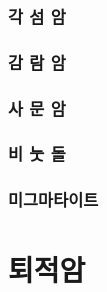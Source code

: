 \documentclass[12pt, a4paper, twoside]{book}
\begin{document}
	\clearpage
	\section{각 섬 암}
	


	\clearpage
	\section{감 람 암}
	



	\clearpage
	\section{사 문 암}
	


	\clearpage
	\section{비 눗 돌}
	


	\clearpage
	\section{미그마타이트}
	

















	
	
		\part{퇴적암}
	
\end{document}
